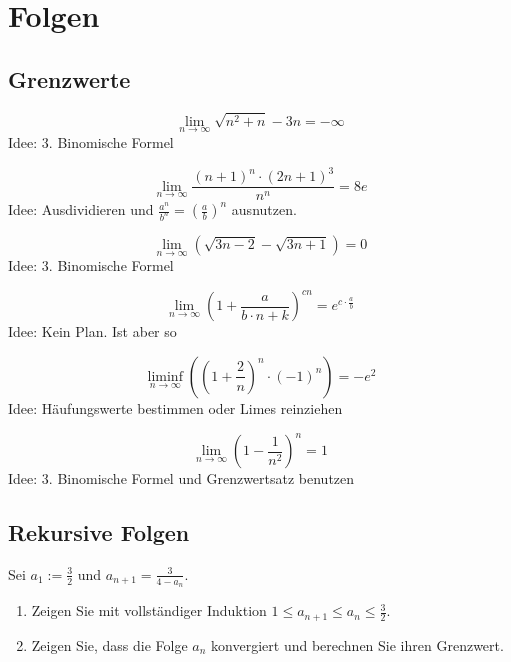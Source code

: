 \section{Folgen}
\subsection{Grenzwerte}
\begin{displaymath}
  \lim_{n \to \infty} {\sqrt{n^2 + n} - 3n} = - \infty
\end{displaymath}
Idee: 3. Binomische Formel

\begin{displaymath}
  \lim_{n \to \infty} \frac{(n+1)^n \cdot (2n+1)^3}{n^n} = 8e
\end{displaymath}
Idee: Ausdividieren und $\frac{a^n}{b^n} = \left( \frac{a}{b}\right) ^n$ ausnutzen.

\begin{displaymath}
  \lim_{n \to \infty} (\sqrt{3n-2} - \sqrt{3n+1}) = 0
\end{displaymath}
Idee: 3. Binomische Formel

\begin{displaymath}
  \lim_{n \to \infty} \left(1 + \frac{a}{b \cdot n + k}\right)^{cn} = e^{c \cdot \frac{a}{b}}
\end{displaymath}
Idee: Kein Plan. Ist aber so

\begin{displaymath}
  \liminf_{n \to \infty} \left(\left(1 + \frac{2}{n}\right)^n \cdot (-1)^n \right) = -e^2
\end{displaymath}
Idee: Häufungswerte bestimmen oder Limes reinziehen

\begin{displaymath}
  \lim_{n \to \infty} \left(1 - \frac{1}{n^2}\right)^n = 1
\end{displaymath}
Idee: 3. Binomische Formel und Grenzwertsatz benutzen

\subsection{Rekursive Folgen}
Sei $a_1 := \frac{3}{2}$ und $a_{n+1} = \frac{3}{4-a_n}$.
\begin{enumerate}
    \item Zeigen Sie mit vollständiger Induktion $1 \leq a_{n+1} \leq a_n \leq \frac{3}{2}$.
    \item Zeigen Sie, dass die Folge $a_n$ konvergiert und berechnen Sie ihren Grenzwert.
\end{enumerate}

